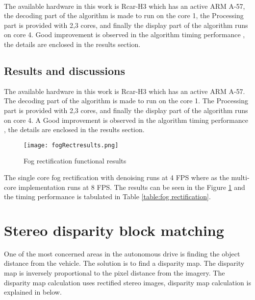 \paragraph*{}The available hardware in this work is Rcar-H3 which has an active ARM A-57, the decoding part of the algorithm is made to run on the core 1, the Processing part is provided with 2,3 cores, and finally the display part of the algorithm runs on core 4. Good improvement is observed in the algorithm timing performance , the details are enclosed in the results section.
\subsection{Results and discussions}
The available hardware in this work is Rcar-H3 which has an active ARM A-57. The decoding part of the algorithm is made to run on the core 1. The Processing part is provided with 2,3 cores, and finally the display part of the algorithm runs on core 4. A Good improvement is observed in the algorithm timing performance , the details are enclosed in the results section.
\begin{figure}[htb]
	\centering
	\texttt{[image: fogRectresults.png]}
	\caption{Fog rectification functional results}
	\label{fig:Fog rectification results}
\end{figure}
The single core fog rectification with denoising runs at 4 FPS where as the multi-core implementation runs at 8 FPS. The results can be seen in the Figure \ref{fig:Fog rectification results} and the timing performance is tabulated in Table \ref{table:fog rectification}.%
\begin{table}[htb]
\caption{Fog rectification algorithm timing performance}
\label{table:fog rectification}
\end{table}
\section{ Stereo disparity block matching}
One of the most concerned areas in the autonomous drive is finding the object distance from the vehicle. The solution is to find a disparity map. The disparity map is inversely proportional to the pixel distance from the imagery. The disparity map calculation uses rectified stereo images, disparity map calculation is explained in below.
